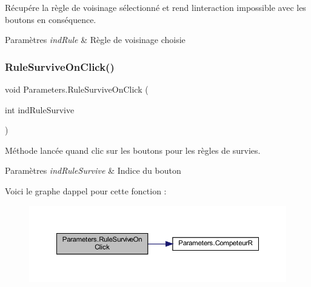 Récupére la règle de voisinage sélectionné et rend l\textquotesingle{}interaction impossible avec les boutons en conséquence. 


\begin{DoxyParams}{Paramètres}
{\em ind\+Rule} & Règle de voisinage choisie\\
\hline
\end{DoxyParams}
\mbox{\label{class_parameters_af62c0383d55e0653fcd2384b9d49d42f}} 
\subsubsection{\texorpdfstring{Rule\+Survive\+On\+Click()}{RuleSurviveOnClick()}}
{\footnotesize\ttfamily void Parameters.\+Rule\+Survive\+On\+Click (\begin{DoxyParamCaption}\item[{int}]{ind\+Rule\+Survive }\end{DoxyParamCaption})\hspace{0.3cm}{\ttfamily [inline]}}



Méthode lancée quand clic sur les boutons pour les règles de survies. 


\begin{DoxyParams}{Paramètres}
{\em ind\+Rule\+Survive} & Indice du bouton\\
\hline
\end{DoxyParams}
Voici le graphe d\textquotesingle{}appel pour cette fonction \+:
\nopagebreak
\begin{figure}[H]
\begin{center}
\leavevmode
\includegraphics[width=350pt]{class_parameters_af62c0383d55e0653fcd2384b9d49d42f_cgraph}
\end{center}
\end{figure}
\mbox{\label{class_parameters_aa31bc8929b4008944bd7f720bfac9a62}} 
